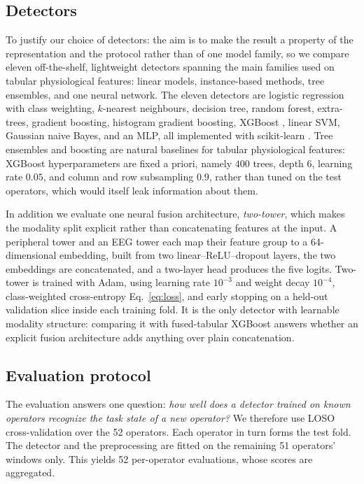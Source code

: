 \documentclass{llncs}
\begin{document}
\subsection{Detectors}

To justify our choice of detectors: the aim is to make the result a property of the
representation and the protocol rather than of one model family, so we compare eleven
off-the-shelf, lightweight detectors spanning the main families used on tabular
physiological features: linear models, instance-based methods, tree ensembles, and
one neural network. The eleven detectors are logistic regression with class weighting, $k$-nearest neighbours,
decision tree, random forest, extra-trees, gradient boosting, histogram gradient
boosting, \ac{XGBoost} \cite{chen2016xgboost}, linear \ac{SVM}, Gaussian naive Bayes,
and an \ac{MLP}, all implemented with scikit-learn
\cite{pedregosa2011scikit}. Tree ensembles and boosting are natural baselines for
tabular physiological features: \ac{XGBoost} hyperparameters are fixed a priori,
namely $400$ trees, depth $6$, learning rate $0.05$, and column and row subsampling
$0.9$, rather than tuned on the test operators, which would itself leak information
about them.

In addition we evaluate one neural fusion architecture, \emph{two-tower}, which makes
the modality split explicit rather than concatenating features at the input. A
peripheral tower and an \ac{EEG} tower each map their feature group to a 64-dimensional
embedding, built from two linear--ReLU--dropout layers, the two embeddings are
concatenated, and a two-layer head produces the five logits. Two-tower is trained
with Adam, using learning rate $10^{-3}$ and weight decay $10^{-4}$, class-weighted
cross-entropy Eq.~\eqref{eq:loss}, and early stopping on a held-out validation slice
inside each training fold. It is the only detector with learnable modality structure:
comparing it
with fused-tabular \ac{XGBoost} answers whether an explicit fusion architecture adds
anything over plain concatenation.

\subsection{Evaluation protocol}
\label{sec:protocol}

The evaluation answers one question: \emph{how well does a detector trained on known
operators recognize the task state of a new operator?} We therefore use \ac{LOSO}
cross-validation over the 52 operators. Each operator in turn forms the test fold. The
detector and the preprocessing are fitted on the remaining 51 operators' windows only.
This yields 52 per-operator evaluations, whose scores are aggregated.
\end{document}
